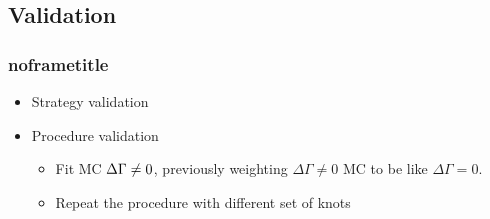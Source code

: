 \documentclass[aspectratio=169,9pt,handout]{beamer}
\newcommand{\pdfnote}[1]{}
\begin{document}
\subsection{Validation}
\begin{frame}[default] %
\frametitle{noframetitle}

  \begin{itemize}
    \item Strategy validation
    \item Procedure validation
    \begin{itemize}
      \item Fit MC ${\small \Delta \Gamma \neq 0}$, previously weighting $\Delta \Gamma \neq 0$ MC to be like $\Delta \Gamma = 0$.
      \item Repeat the procedure with different set of knots
    \end{itemize} 
  \end{itemize}


\pdfnote{Finishing with the time accepntace, just a brief summary of the validation we have still to do}
\pdfnote{First, Concerning the validtation of the Strategy, we compute B+ and B0 lifetimes}
\pdfnote{Secondly, a procedure Validation is done. This is already implemented, whilst the Strategy is currently ongoing}

\end{frame} %
\end{document}
